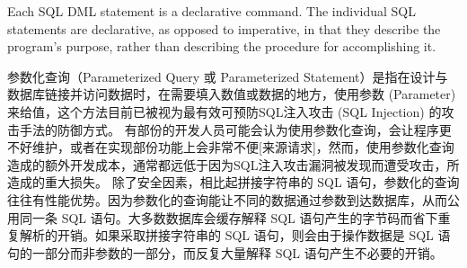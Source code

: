 Each SQL DML statement is a declarative command. The individual SQL statements are declarative, as opposed to imperative, in that they describe the program's purpose, rather than describing the procedure for accomplishing it.

参数化查询（Parameterized Query 或 Parameterized Statement）是指在设计与数据库链接并访问数据时，在需要填入数值或数据的地方，使用参数 (Parameter) 来给值，这个方法目前已被视为最有效可预防SQL注入攻击 (SQL Injection) 的攻击手法的防御方式。
有部份的开发人员可能会认为使用参数化查询，会让程序更不好维护，或者在实现部份功能上会非常不便[来源请求]，然而，使用参数化查询造成的额外开发成本，通常都远低于因为SQL注入攻击漏洞被发现而遭受攻击，所造成的重大损失。
除了安全因素，相比起拼接字符串的 SQL 语句，参数化的查询往往有性能优势。因为参数化的查询能让不同的数据通过参数到达数据库，从而公用同一条 SQL 语句。大多数数据库会缓存解释 SQL 语句产生的字节码而省下重复解析的开销。如果采取拼接字符串的 SQL 语句，则会由于操作数据是 SQL 语句的一部分而非参数的一部分，而反复大量解释 SQL 语句产生不必要的开销。
